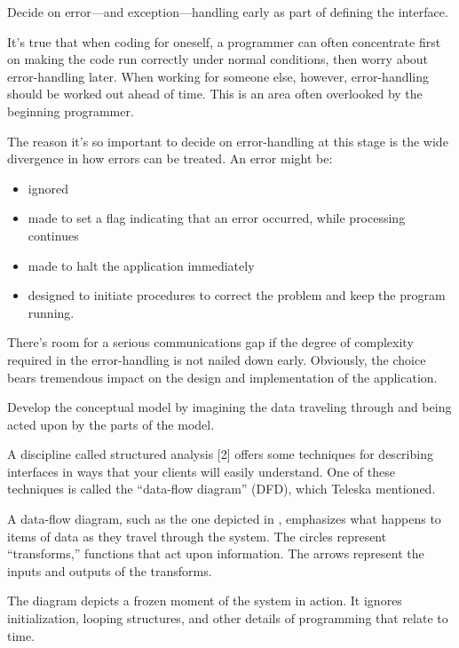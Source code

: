 \begin{tip}
Decide on error---and exception---handling early as part of defining the
interface.
\end{tip}

\noindent It's true that when coding for oneself, a programmer can often
concentrate first on making the code run correctly under normal conditions,
then worry about error-handling later. When working for someone else,
however, error-handling should be worked out ahead of time. This is an
area often overlooked by the beginning programmer.

The reason it's so important to decide on error-handling at this
stage is the wide divergence in how errors can be treated. An error might
be:

\begin{itemize}
\item ignored
\item made to set a flag indicating that an error occurred, while processing
continues
\item made to halt the application immediately
\item designed to initiate procedures to correct the problem and keep the
program running.
\end{itemize}


There's room for a serious communications gap if the degree of
complexity required in the error-handling is not nailed down early. Obviously, the
choice bears tremendous impact on the design and implementation of the
application.

\begin{tip}
Develop the conceptual model by imagining the data traveling through and
being acted upon by the parts of the model.
\end{tip}

\noindent A discipline called structured analysis {[}2{]} offers some techniques for
describing interfaces in ways that your clients will easily understand.
One of these techniques is called the ``data-flow diagram'' (DFD), which
Teleska mentioned.

A data-flow diagram, such as the one depicted in ,
emphasizes what happens to items of data as they travel through the system.
The circles represent ``transforms,'' functions that act upon information.
The arrows represent the inputs and outputs of the transforms.

The diagram depicts a frozen moment of the system in action. It
ignores initialization, looping structures, and other details of
programming that relate to time.

